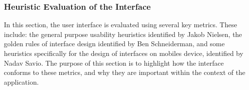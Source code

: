 \subsubsection{Heuristic Evaluation of the Interface}
In this section, the user interface is evaluated using several key metrics. These include: the general purpose usability heuristics identified by Jakob Nielsen\cite{nielsen199510}, the golden rules of interface design identified by Ben Schneiderman\cite{shneiderman2005designing}, and some heuristics specifically for the design of interfaces on mobiles device, identified by Nadav Savio\cite{savio2007design}. The purpose of this section is to highlight how the interface conforms to these metrics, and why they are important within the context of the application.\ \\
\ \\
